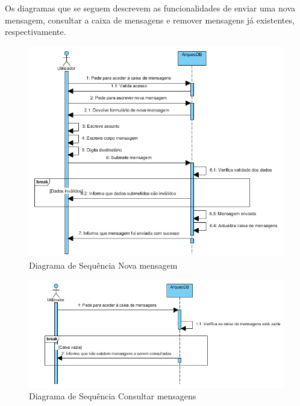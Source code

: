 ﻿\documentclass[12pt,a4paper]{article}
\begin{document}
\clearpage

Os diagramas que se seguem descrevem as funcionalidades de enviar uma nova mensagem, consultar a caixa de mensagens e remover mensagens já existentes, respectivamente.\\

\begin{figure}[h!]
\centering
\includegraphics[scale=1]{sequencia/enviarmensagem}
\caption{Diagrama de Sequência Nova mensagem} 
\end{figure}

\begin{figure}[h!]
\centering
\includegraphics[scale=0.8]{sequencia/consultarmensagem}
\caption{Diagrama de Sequência Consultar mensagens} 
\end{figure}
\end{document}
